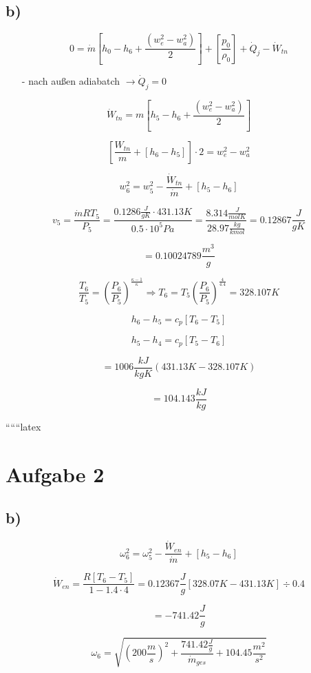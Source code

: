 

\subsection*{b)}

\[
0 = \dot{m} \left[ h_0 - h_6 + \frac{(w_e^2 - w_a^2)}{2} \right] + \left[ \frac{p_0}{\rho_0} \right] + \dot{Q}_j - \dot{W}_{tn}
\]

\begin{itemize}
    \item[-] nach außen adiabatch $\rightarrow \dot{Q}_j = 0$
\end{itemize}

\[
\dot{W}_{tn} = m \left[ h_5 - h_6 + \frac{(w_e^2 - w_a^2)}{2} \right]
\]

\[
\left[ \frac{W_{tn}}{m} + \left[ h_6 - h_5 \right] \right] \cdot 2 = w_e^2 - w_a^2
\]

\[
w_6^2 = w_5^2 - \frac{\dot{W}_{tn}}{\dot{m}} + \left[ h_5 - h_6 \right]
\]

\[
v_5 = \frac{\dot{m} RT_5}{P_5} = \frac{0.1286 \frac{J}{gK} \cdot 431.13K}{0.5 \cdot 10^5 Pa} = \frac{8.314 \frac{J}{molK}}{28.97 \frac{kg}{kmol}} = 0.12867 \frac{J}{gK}
\]

\[
= 0.10024789 \frac{m^3}{g}
\]

\[
\frac{T_6}{T_5} = \left( \frac{P_6}{P_5} \right)^{\frac{\kappa - 1}{\kappa}} \Rightarrow T_6 = T_5 \left( \frac{P_6}{P_5} \right)^{\frac{4}{4.4}} = 328.107 K
\]

\[
h_6 - h_5 = c_p \left[ T_6 - T_5 \right]
\]

\[
h_5 - h_4 = c_p \left[ T_5 - T_6 \right]
\]

\[
= 1006 \frac{kJ}{kgK} \left( 431.13K - 328.107K \right)
\]

\[
= 104.143 \frac{kJ}{kg}
\]

``````latex


\section*{Aufgabe 2}



\subsection*{b)}

\begin{equation*}
    \omega_6^2 = \omega_5^2 - \frac{\dot{W}_{en}}{\dot{m}} + \left[ h_5 - h_6 \right]
\end{equation*}

\begin{equation*}
    \dot{W}_{en} = \frac{R \left[ T_6 - T_5 \right]}{1 - 1.4 \cdot 4} = 0.12367 \frac{J}{g} \left[ 328.07 K - 431.13 K \right] \div 0.4
\end{equation*}

\begin{equation*}
    = -741.42 \frac{J}{g}
\end{equation*}

\begin{equation*}
    \omega_6 = \sqrt{(200 \frac{m}{s})^2 + \frac{741.42 \frac{J}{g}}{\dot{m}_{ges}} + 104.45 \frac{m^2}{s^2}}
\end{equation*}